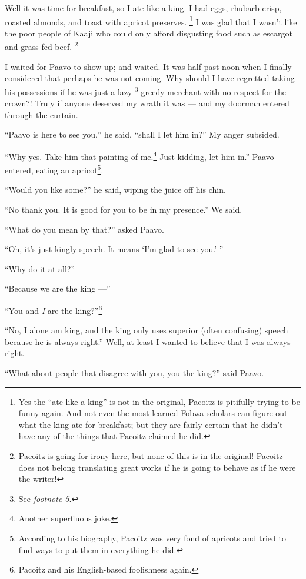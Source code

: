 Well it was time for breakfast, so I ate like a king. I had eggs, rhubarb crisp, roasted almonds, and toast with apricot preserves. \footnote{Yes the ``ate like a king'' is not in the original, Pa\-co\-itz is pitifully trying to be funny again. And not even the most learned Fo\-bwa scholars can figure out what the king ate for breakfast; but they are fairly certain that he didn't have any of the things that Pa\-co\-itz claimed he did.}
I was glad that I wasn't like the poor people of Kaa\-ji who could only afford disgusting food such as escargot and grass-fed beef. \footnote{Pa\-co\-itz is going for irony here, but none of this is in the original! Pa\-co\-itz does not belong translating great works if he is going to behave as if he were the writer!}

I waited for Paa\-vo to show up; and waited.
It was half past noon when I finally considered that perhaps he was not coming.
Why should I have regretted taking his possessions if he was just a lazy
\footnote{See \emph{footnote 5}.} greedy merchant with no respect for the crown?!
Truly if anyone deserved my wrath it was --- and my doorman entered through the curtain.

``Paa\-vo is here to see you,'' he said, ``shall I let him in?'' My anger subsided.

``Why yes. Take him that painting of me.\footnote{Another superfluous joke.} Just kidding, let him in.'' Paa\-vo entered, eating an apricot\footnote{According to his biography, Pa\-co\-itz was very fond of apricots and tried to find ways to put them in everything he did.}.

``Would you like some?'' he said, wiping the juice off his chin.

``No thank you. It is good for you to be in my presence.'' We said.

``What do you mean by that?'' asked Paa\-vo.

``Oh, it's just kingly speech. It means `I'm glad to see you.' ''

``Why do it at all?''

``Because we are the king ---''

``You and \emph{I} are the king?''\footnote{Pa\-co\-itz and his English-based foolishness again.}

``No, I alone am king, and the king only uses superior (often confusing) speech because he is always right.'' Well, at least I wanted to believe that I was always right.

``What about people that disagree with you, you the king?'' said Paa\-vo.

